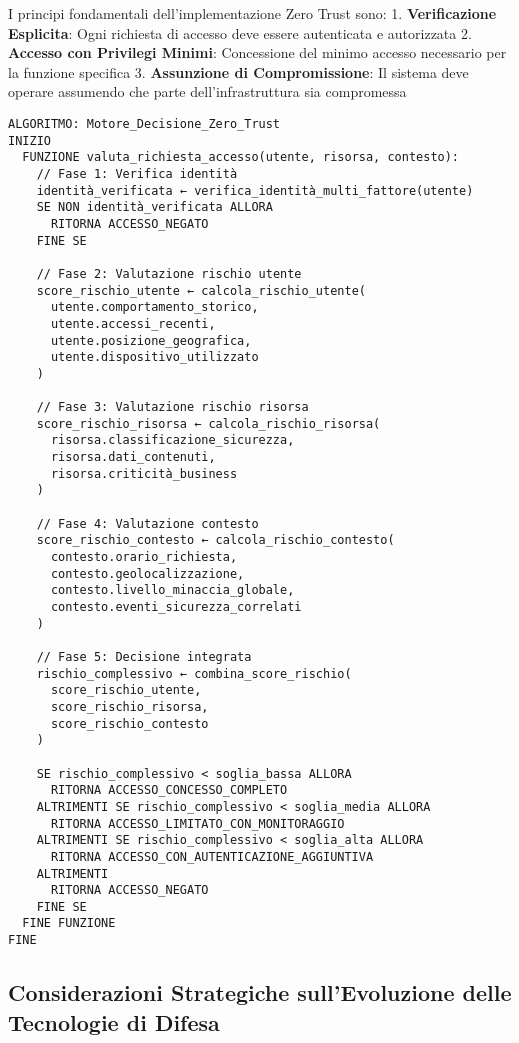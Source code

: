 {I principi fondamentali dell'implementazione Zero Trust sono:
1. \textbf{Verificazione Esplicita}: Ogni richiesta di accesso deve essere autenticata e autorizzata
2. \textbf{Accesso con Privilegi Minimi}: Concessione del minimo accesso necessario per la funzione specifica
3. \textbf{Assunzione di Compromissione}: Il sistema deve operare assumendo che parte dell'infrastruttura sia compromessa

\begin{verbatim}
ALGORITMO: Motore_Decisione_Zero_Trust
INIZIO
  FUNZIONE valuta_richiesta_accesso(utente, risorsa, contesto):
    // Fase 1: Verifica identità
    identità_verificata ← verifica_identità_multi_fattore(utente)
    SE NON identità_verificata ALLORA
      RITORNA ACCESSO_NEGATO
    FINE SE
    
    // Fase 2: Valutazione rischio utente
    score_rischio_utente ← calcola_rischio_utente(
      utente.comportamento_storico,
      utente.accessi_recenti,
      utente.posizione_geografica,
      utente.dispositivo_utilizzato
    )
    
    // Fase 3: Valutazione rischio risorsa
    score_rischio_risorsa ← calcola_rischio_risorsa(
      risorsa.classificazione_sicurezza,
      risorsa.dati_contenuti,
      risorsa.criticità_business
    )
    
    // Fase 4: Valutazione contesto
    score_rischio_contesto ← calcola_rischio_contesto(
      contesto.orario_richiesta,
      contesto.geolocalizzazione,
      contesto.livello_minaccia_globale,
      contesto.eventi_sicurezza_correlati
    )
    
    // Fase 5: Decisione integrata
    rischio_complessivo ← combina_score_rischio(
      score_rischio_utente,
      score_rischio_risorsa, 
      score_rischio_contesto
    )
    
    SE rischio_complessivo < soglia_bassa ALLORA
      RITORNA ACCESSO_CONCESSO_COMPLETO
    ALTRIMENTI SE rischio_complessivo < soglia_media ALLORA
      RITORNA ACCESSO_LIMITATO_CON_MONITORAGGIO
    ALTRIMENTI SE rischio_complessivo < soglia_alta ALLORA
      RITORNA ACCESSO_CON_AUTENTICAZIONE_AGGIUNTIVA
    ALTRIMENTI
      RITORNA ACCESSO_NEGATO
    FINE SE
  FINE FUNZIONE
FINE
\end{verbatim}

\subsection{Considerazioni Strategiche sull'Evoluzione delle Tecnologie di Difesa}

}
